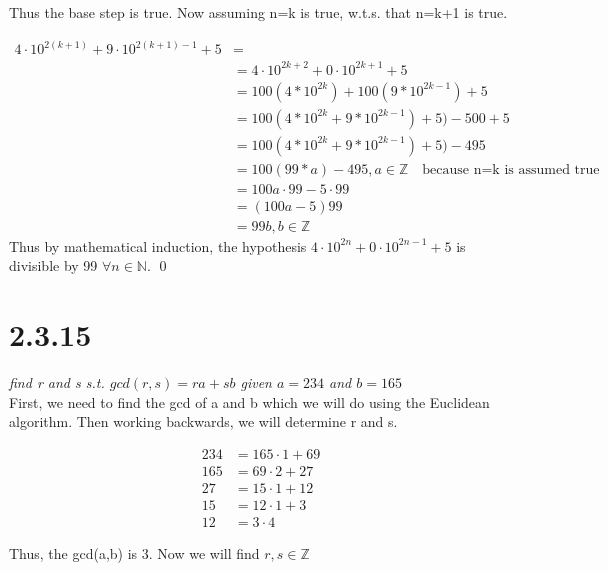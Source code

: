 \documentclass[a4paper, 11pt]{article}
\begin{document}
Thus the base step is true. Now assuming n=k is true, w.t.s. that n=k+1 is true. 

\begin{align*}
	4 \cdot 10^{2(k+1)}	+ 9 \cdot 10^{2(k+1)-1} + 5 &= \\ 
	&= 4 \cdot 10^{2k+2} + 0 \cdot 10^{2k+1} + 5 \\ 
	&= 100(4*10^{2k}) + 100(9*10^{2k-1}) + 5 \\ 
	&= 100(4*10^{2k} + 9*10^{2k-1}) + 5) -500 + 5 \\ 
	&= 100(4*10^{2k} + 9*10^{2k-1}) + 5) -495 \\ 
	&= 100(99*a) -495, a\in \mathbb{Z} \quad \mbox{because n=k is assumed true} \\
	&= 100a \cdot 99 - 5\cdot 99 \\ 
	&= (100a - 5)99 \\ 
	&= 99b, b\in \mathbb{Z}
\end{align*}
Thus by mathematical induction, the hypothesis $4 \cdot 10^{2n} + 0 \cdot 10 ^{2n-1} +5$ is divisible by 99 $\forall n \in \mathbb{N}$. \qed


\section*{2.3.15} 
\textit{find r and s s.t. $gcd(r,s) = ra + sb$ given $a=234$ and $b=165$} \\ 

First, we need to find the gcd of a and b which we will do using the Euclidean algorithm. Then working backwards, we will determine r and s. 

\begin{align*}
	234 &= 165\cdot 1 + 69 \\ 
	165 &= 69 \cdot 2 + 27 \\ 
	27 &= 15 \cdot 1 + 12 \\ 
	15 &= 12 \cdot 1 + 3 \\ 
	12 &= 3\cdot 4
\end{align*}

Thus, the gcd(a,b) is 3. Now  we will find $r,s \in \mathbb{Z}$
\end{document}
